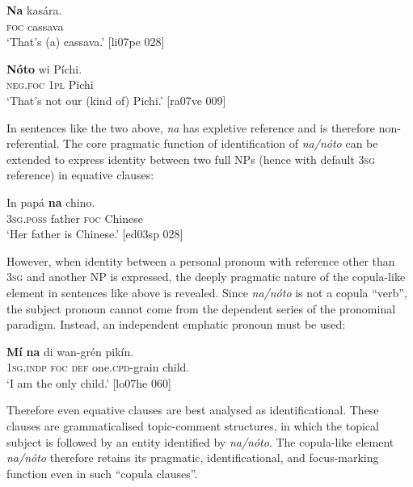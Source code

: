 \ea%
    \label{ex:key:766}
    \gll \textbf{Na} kasára.\\
\textsc{foc}  cassava\\

\glt ‘That’s (a) cassava.’ [li07pe 028]
\z


\ea%
    \label{ex:key:767}
    \gll \textbf{N}\textbf{óto}  wi  Píchi.\\
\textsc{neg.foc}  \textsc{1pl}  Pichi\\

\glt ‘That’s not our (kind of) Pichi.’ [ra07ve 009]
\z

In sentences like the two above, \textit{na} has expletive reference and is therefore non-referential. The core pragmatic function of identification of \textit{na}\textit{\textup{/}}\textit{nóto} can be extended to express identity between two full NPs (hence with default \textsc{3sg} reference) in equative clauses: 


\ea%
    \label{ex:key:768}
    \gll In    papá  \textbf{na} chino.\\
\textsc{3sg.poss}  father  \textsc{foc}  Chinese\\

\glt ‘Her father is Chinese.’ [ed03sp 028]
\z

However, when identity between a personal pronoun with reference other than \textsc{3sg} and another NP is expressed, the deeply pragmatic nature of the copula-like element in sentences like  above is revealed. Since \textit{na}\textit{\textup{/}}\textit{nóto} is not a copula “verb”, the subject pronoun cannot come from the dependent series of the pronominal paradigm. Instead, an independent emphatic pronoun must be used: 


\ea
	\label{ex:key:769}
	\gll
\textbf{Mí}    \textbf{na}  di wan-grén  pikín.\\
\textsc{1sg.indp}  \textsc{foc}  \textsc{def}  one.\textsc{cpd}{}-grain  child.\\

\glt ‘I am the only child.’ [lo07he 060]
\z

Therefore even equative clauses are best analysed as identificational. These clauses are grammaticalised topic-comment structures, in which the topical subject is followed by an entity identified by \textit{na}\textit{\textup{/}}\textit{nóto}. The copula-like element \textit{na}\textit{\textup{/}}\textit{nóto} therefore retains its pragmatic, identificational, and focus-marking function even in such “copula clauses”. 


